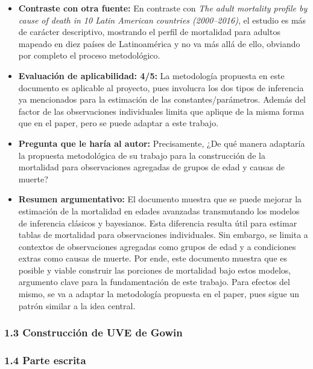 \documentclass[
  letterpaper,
  DIV=11,
  numbers=noendperiod]{scrartcl}
\begin{document}
\begin{itemize}
  Colombia. Además de que sus variables son observaciones individuales y
  no variables agregadas, como los grupos de edad.
\item
  \textbf{Contraste con otra fuente:} En contraste con \emph{The adult
  mortality profile by cause of death in 10 Latin American countries
  (2000--2016)}, el estudio es más de carácter descriptivo, mostrando el
  perfil de mortalidad para adultos mapeado en diez países de
  Latinoamérica y no va más allá de ello, obviando por completo el
  proceso metodológico.
\item
  \textbf{Evaluación de aplicabilidad: 4/5:} La metodología propuesta en
  este documento es aplicable al proyecto, pues involucra los dos tipos
  de inferencia ya mencionados para la estimación de las
  constantes/parámetros. Además del factor de las observaciones
  individuales limita que aplique de la misma forma que en el paper,
  pero se puede adaptar a este trabajo.
\item
  \textbf{Pregunta que le haría al autor:} Precisamente, ¿De qué manera
  adaptaría la propuesta metodológica de su trabajo para la construcción
  de la mortalidad para observaciones agregadas de grupos de edad y
  causas de muerte?
\item
  \textbf{Resumen argumentativo:} El documento muestra que se puede
  mejorar la estimación de la mortalidad en edades avanzadas
  transmutando los modelos de inferencia clásicos y bayesianos. Esta
  diferencia resulta útil para estimar tablas de mortalidad para
  observaciones individuales. Sin embargo, se limita a contextos de
  observaciones agregadas como grupos de edad y a condiciones extras
  como causas de muerte. Por ende, este documento muestra que es posible
  y viable construir las porciones de mortalidad bajo estos modelos,
  argumento clave para la fundamentación de este trabajo. Para efectos
  del mismo, se va a adaptar la metodología propuesta en el paper, pues
  sigue un patrón similar a la idea central.
\end{itemize}

\subsubsection{1.3 Construcción de UVE de
Gowin}\label{construcciuxf3n-de-uve-de-gowin}

\subsubsection{1.4 Parte escrita}\label{parte-escrita}
\end{document}
